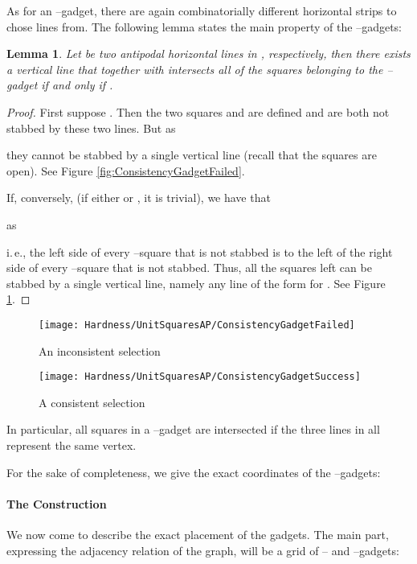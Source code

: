 \documentclass[12pt]{article}
\newtheorem{lemma}[definition]{Lemma}
\begin{document}
As for an --gadget, there are again  combinatorially different horizontal strips to chose lines from. The following lemma states the main property of the --gadgets:
\begin{lemma}\label{Lemma:ConsistencyLemma} Let  be two antipodal horizontal lines in , respectively, then there exists a vertical line that together with  intersects all of the squares belonging to the --gadget if and only if .
\end{lemma}
\begin{proof}
First suppose . Then the two squares  and  are defined and are both not stabbed by these two lines. But as 

they cannot be stabbed by a single vertical line (recall that the squares are open). See Figure \ref{fig:ConsistencyGadgetFailed}.

If, conversely,  (if either  or , it is trivial), we have that

as 
 
i.\,e., the left side of every --square that is not stabbed is to the left of the right side of every --square that is not stabbed. Thus, all the squares left can be stabbed by a single vertical line, namely any line of the form  for . See Figure \ref{fig:ConsistencyGadgetSuccess}. 
\end{proof}

\begin{figure}
	\begin{minipage}[t]{0.5\textwidth}
		\centering \texttt{[image: Hardness/UnitSquaresAP/ConsistencyGadgetFailed]}
		\caption{An inconsistent selection}
		\label{fig:ConsistencyGadgetFailed}
	\end{minipage}\begin{minipage}[t]{0.5\textwidth}
		\centering \texttt{[image: Hardness/UnitSquaresAP/ConsistencyGadgetSuccess]}
		\caption{A consistent selection}
		\label{fig:ConsistencyGadgetSuccess}
	\end{minipage}
\end{figure} 
In particular, all squares in a --gadget are intersected if the three lines in  all represent the same vertex.

For the sake of completeness, we give the exact coordinates of the --gadgets:


\paragraph{The Construction}
We now come to describe the exact placement of the gadgets. The main part, expressing the adjacency relation of the graph, will be a  grid of -- and --gadgets:
\end{document}
